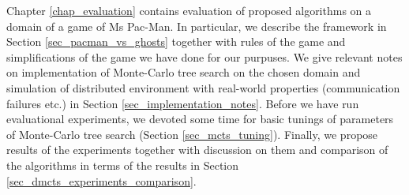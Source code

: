 Chapter \ref{chap_evaluation} contains evaluation of proposed algorithms on a domain of a
game of Ms Pac-Man. In
particular, we describe the framework in Section \ref{sec_pacman_vs_ghosts} together with rules
of the game and simplifications of the game we have done for our purpuses. We give relevant
notes on implementation of Monte-Carlo tree search on the chosen domain and simulation of
distributed environment with real-world properties (communication failures etc.) in Section 
\ref{sec_implementation_notes}. Before we have run evaluational experiments, we devoted some time for
basic tunings of parameters of Monte-Carlo tree search (Section \ref{sec_mcts_tuning}).
Finally, we propose results of the experiments together with discussion on them and comparison
of the algorithms in terms of the results in Section \ref{sec_dmcts_experiments_comparison}.

